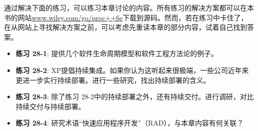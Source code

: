 通过解决下面的练习，可以练习本章讨论的内容。所有练习的解决方案都可以在本书的网站\url{www.wiley.com/go/proc++6e}下载到源码。然而，若在练习中卡住了，在从网站上寻找解决方案之前，可以考虑先重读本章的部分内容，试着自己找到答案。

\begin{itemize}
\item
\textbf{练习 28-1}: 提供几个软件生命周期模型和软件工程方法论的例子。

\item
\textbf{练习 28-2}: XP提倡持续集成。如果你认为这听起来很极端，一些公司近年来更进一步实行持续部署。进行一些研究，找出持续部署的含义。

\item
\textbf{练习 28-3}: 除了练习 28-2中的持续部署之外，还有持续交付。进行调研，对比持续交付与持续部署。

\item
\textbf{练习 28-4}: 研究术语“快速应用程序开发”（RAD），与本章内容有何关联？
\end{itemize}










